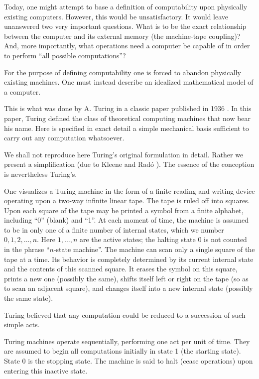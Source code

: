 \documentclass[11pt]{article}
\newcommand{\origpage}[1]{\marginnote{\footnotesize\textbf{[#1]}}}
\begin{document}
Today, one might attempt to base a definition of computability upon physically existing computers. However, this would be unsatisfactory. It would leave unanswered two very important questions. What is to be the exact relationship between the computer and its external memory (the machine-tape coupling)? And, more importantly, what operations need a computer be capable of in order to perform ``all possible computations''?

For the purpose of defining computability one is forced to abandon physically existing machines. One must instead describe an idealized mathematical model of a computer.

This is what was done by A. Turing in a classic paper published in 1936 \cite{r42}. In this paper, Turing defined the class of theoretical computing machines that now bear his name. Here is specified in exact detail a simple mechanical basis sufficient to carry out any computation whatsoever.

We shall not reproduce here Turing's original formulation in detail. Rather we present a simplification (due to Kleene \cite{r18} and Radó \cite{r32}). The essence of the conception is nevertheless Turing's.

One visualizes a Turing machine in the form of a finite reading and writing device operating upon a two-way infinite linear tape. The tape is ruled off into squares. Upon each square of the tape may be printed a symbol from a finite alphabet, including ``0'' (blank) and ``1''. At each moment of time, the machine is assumed to be in only one of a finite number of internal states, which we number $0,1,2,\ldots,n$. Here $1,\ldots,n$ are the active states; the halting state $0$ is not counted in the phrase ``$n$-state machine''. The machine can scan only a single square of the tape at a time. Its behavior is completely determined by its current internal state and the contents of this scanned square. It erases the symbol on this square, prints a new one (possibly the same), shifts itself left or right on the tape (so as to scan an adjacent square), and changes itself into a new internal state (possibly the same state).

Turing believed that any computation could be reduced to a succession of such simple acts.

Turing machines operate sequentially, performing one act per unit of time. They are assumed to begin all computations initially in state 1 (the starting state). State 0
\origpage{730}is the stopping state. The machine is said to halt (cease operations) upon entering this inactive state.
\end{document}
